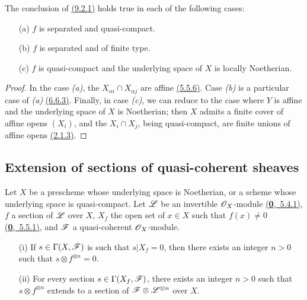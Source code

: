 \begin{cor}[9.2.2]
\label{cor-1.9.2.2}
The conclusion of \hyperref[prop-1.9.2.1]{(9.2.1)} holds true in each of the following cases:
\begin{itemize}
  \item[{\rm(a)}] $f$ is separated and quasi-compact.
  \item[{\rm(b)}] $f$ is separated and of finite type.
  \item[{\rm(c)}] $f$ is quasi-compact and the underlying space of $X$ is locally Noetherian.
\end{itemize}
\end{cor}

\begin{proof}
\label{proof-cor-1.9.2.2}
In the case {\em (a)}, the $X_{\alpha i}\cap X_{\alpha j}$ are affine \hyperref[env-1.5.5.6]{(5.5.6)}.
Case {\em (b)} is a particular case of {\em (a)} \hyperref[env-1.6.6.3]{(6.6.3)}. Finally, in case
{\em (c)}, we can reduce to the case where $Y$ is affine and the underlying
space of $X$ is Noetherian; then $X$ admits a finite cover of affine opens
$(X_i)$, and the $X_i\cap X_j$, being quasi-compact, are finite unions of affine
opens \hyperref[prop-1.2.1.3]{(2.1.3)}.
\end{proof}

\subsection{Extension of sections of quasi-coherent sheaves}
\label{subsection-extension-of-sections-of-qcoh}

\begin{thm}[9.3.1]
\label{thm-1.9.3.1}
Let $X$ be a prescheme whose underlying space is Noetherian, or a scheme whose underlying
space is quasi-compact. Let $\mathscr{L}$ be an invertible $\mathscr{O}_X$-module \hyperref[env-0.5.4.1]{(\textbf{0},~5.4.1)}, $f$ a
section of $\mathscr{L}$ over $X$, $X_f$ the open set of $x\in X$ such that $f(x)\neq0$
\hyperref[env-0.5.5.1]{(\textbf{0},~5.5.1)}, and $\mathscr{F}$ a quasi-coherent $\mathscr{O}_X$-module.
\begin{itemize}
  \item[{\rm(i)}] If $s\in\Gamma(X,\mathscr{F})$ is such that $s|X_f=0$, then there exists an integer $n>0$
    such that $s\otimes f^{\otimes n}=0$.
  \item[{\rm(ii)}] For every section $s\in\Gamma(X_f,\mathscr{F})$, there exists an integer $n>0$ such that
    $s\otimes f^{\otimes n}$ extends to a section of $\mathscr{F}\otimes\mathscr{L}^{\otimes n}$
        over $X$.
\end{itemize}
\end{thm}

